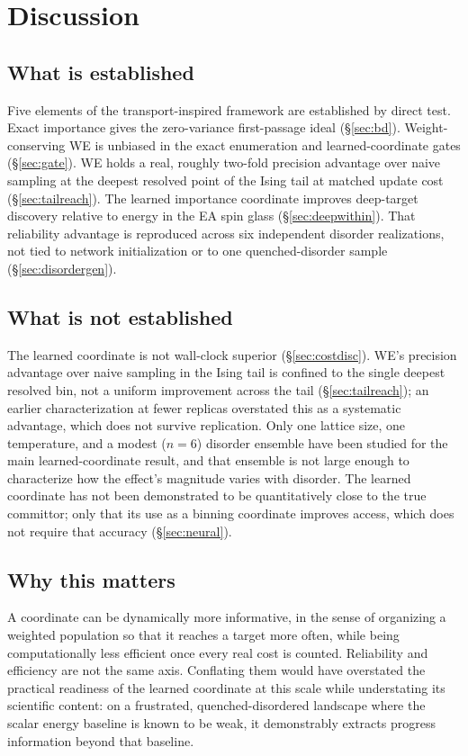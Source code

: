 \documentclass[a4paper,fleqn]{cas-sc}
\begin{document}
\FloatBarrier

\section{Discussion}\label{sec:discussion}

\subsection{What is established}\label{sec:established}
Five elements of the transport-inspired framework are established by direct test. Exact
importance gives the zero-variance first-passage ideal (\S\ref{sec:bd}). Weight-conserving WE
is unbiased in the exact enumeration and learned-coordinate gates (\S\ref{sec:gate}). WE holds
a real, roughly two-fold precision advantage over naive sampling at the deepest resolved point
of the Ising tail at matched update cost (\S\ref{sec:tailreach}). The learned importance
coordinate improves deep-target discovery relative to energy in the EA spin glass
(\S\ref{sec:deepwithin}). That reliability advantage is reproduced across six independent
disorder realizations, not tied to network initialization or to one quenched-disorder sample
(\S\ref{sec:disordergen}).

\subsection{What is not established}\label{sec:notestablished}
The learned coordinate is not wall-clock superior (\S\ref{sec:costdisc}). WE's precision
advantage over naive sampling in the Ising tail is confined to the single deepest resolved
bin, not a uniform improvement across the tail (\S\ref{sec:tailreach}); an earlier
characterization at fewer replicas overstated this as a systematic advantage, which does not
survive replication. Only one lattice size, one temperature, and a modest ($n=6$) disorder
ensemble have been studied for the main learned-coordinate result, and that ensemble is not
large enough to characterize how the effect's magnitude varies with disorder. The learned
coordinate has not been demonstrated to be quantitatively close to the true committor; only
that its use as a binning coordinate improves access, which does not require that accuracy
(\S\ref{sec:neural}).

\subsection{Why this matters}\label{sec:whymatters}
A coordinate can be dynamically more informative, in the sense of organizing a weighted
population so that it reaches a target more often, while being computationally less efficient
once every real cost is counted. Reliability and efficiency are not the same axis. Conflating
them would have overstated the practical readiness of the learned coordinate at this scale
while understating its scientific content: on a frustrated, quenched-disordered landscape
where the scalar energy baseline is known to be weak, it demonstrably extracts progress
information beyond that baseline.
\end{document}
